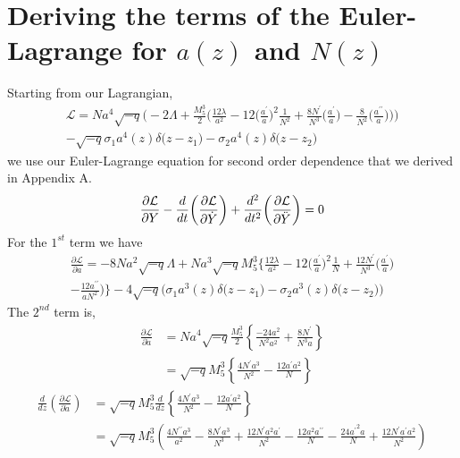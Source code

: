 \documentclass[11pt]{report}
\numberwithin{equation}{chapter}
\begin{document}
\chapter{Deriving the terms of the Euler-Lagrange for $a(z)$ and $N(z)$}
Starting from our Lagrangian,
\begin{multline}
    \mathcal{L}=Na^4\sqrt {-q}\bigg(-2\Lambda+\frac{M^3_5}{2}\bigg(\frac{12\lambda}{a^2}-12\bigg(\frac{a^\prime}{a}\bigg)^2\frac{1}{N^2}+\frac{8N^\prime}{N^3}\bigg(\frac{a^\prime}{a}\bigg)-\frac{8}{N^2}\bigg(\frac{a^{\prime\prime}}{a}\bigg)\bigg)\bigg)\\
    -\sqrt{-q}\sigma_1a^4(z)\delta\big(z-z_1\big)-\sigma_2a^4(z)\delta\big(z-z_2\big)
\end{multline}
we use our Euler-Lagrange equation for second order dependence that we derived in Appendix A.
\begin{equation}
    \frac{\partial\mathcal{L}}{\partial Y}-\frac{d}{dt}\bigg(\frac{\partial\mathcal{L}}{\partial \Dot{Y}}\bigg)+\frac{d^2}{dt^2}\bigg(\frac{\partial\mathcal{L}}{\partial \Ddot{Y}}\bigg)=0
\end{equation}
For the $1^{st}$ term we have
\begin{multline}
    \frac{\partial\mathcal{L}}{\partial a}=-8Na^2\sqrt{-q}\Lambda+Na^3\sqrt{-q}M_5^3\bigg\{\frac{12\lambda}{a^2}-12\bigg(\frac{a^\prime}{a}\bigg)^2\frac{1}{N}+\frac{12N^\prime}{N^3}\bigg(\frac{a^\prime}{a}\bigg)\\
    -\frac{12a^{\prime\prime}}{aN^2}\bigg)\bigg\}-4\sqrt{-q}\bigg(\sigma_1a^3(z)\delta\bigg(z-z_1\bigg)-\sigma_2a^3(z)\delta\bigg(z-z_2\bigg)\bigg)
\end{multline}
\noindent The $2^{nd}$ term is,
\begin{align}
     \frac{\partial\mathcal{L}}{\partial\Dot{a}}&=Na^4\sqrt{-q}\frac{M_5^3}{2}\left\{\frac{-24a^2}{N^2a^2}+\frac{8N^\prime}{N^3a}\right\} \nonumber\\
     &= \sqrt{-q}M^3_5\left\{\frac{4N^\prime a^3}{N^2}-\frac{12a^\prime a^2}{N}\right\}
\end{align}
\begin{align}
    \frac{d}{dz}\left(\frac{\partial\mathcal{L}}{\partial\Dot{a}}\right)&=\sqrt{-q}M^3_5 \frac{d}{dz}\left\{\frac{4N^\prime a^3}{N^2}-\frac{12a^\prime a^2}{N}\right\}\nonumber\\
    &=\sqrt{-q}M^3_5\left(\frac{4N^{\prime\prime}a^3}{a^2}-\frac{8N^\prime a^3}{N^3}+\frac{12N^\prime a^2 a^\prime}{N^2}-\frac{12a^2 a^{\prime\prime}}{N}-\frac{24{a^\prime}^2 a}{N}+\frac{12N^\prime a^\prime a^2}{N^2}\right)
\end{align}
\end{document}
